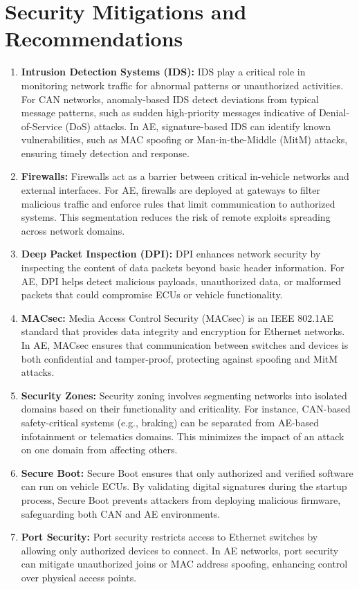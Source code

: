 \documentclass{report}
\begin{document}
\section{Security Mitigations and Recommendations}
\begin{enumerate}
    \item \textbf{Intrusion Detection Systems (IDS):}
    IDS play a critical role in monitoring network traffic for abnormal patterns or unauthorized activities. For CAN networks, anomaly-based IDS detect deviations from typical message patterns, such as sudden high-priority messages indicative of Denial-of-Service (DoS) attacks. In AE, signature-based IDS can identify known vulnerabilities, such as MAC spoofing or Man-in-the-Middle (MitM) attacks, ensuring timely detection and response.

    \item \textbf{Firewalls:}
    Firewalls act as a barrier between critical in-vehicle networks and external interfaces. For AE, firewalls are deployed at gateways to filter malicious traffic and enforce rules that limit communication to authorized systems. This segmentation reduces the risk of remote exploits spreading across network domains.

    \item \textbf{Deep Packet Inspection (DPI):}
    DPI enhances network security by inspecting the content of data packets beyond basic header information. For AE, DPI helps detect malicious payloads, unauthorized data, or malformed packets that could compromise ECUs or vehicle functionality.

    \item \textbf{MACsec:}
    Media Access Control Security (MACsec) is an IEEE 802.1AE standard that provides data integrity and encryption for Ethernet networks. In AE, MACsec ensures that communication between switches and devices is both confidential and tamper-proof, protecting against spoofing and MitM attacks.

    \item \textbf{Security Zones:}
    Security zoning involves segmenting networks into isolated domains based on their functionality and criticality. For instance, CAN-based safety-critical systems (e.g., braking) can be separated from AE-based infotainment or telematics domains. This minimizes the impact of an attack on one domain from affecting others.

    \item \textbf{Secure Boot:}
    Secure Boot ensures that only authorized and verified software can run on vehicle ECUs. By validating digital signatures during the startup process, Secure Boot prevents attackers from deploying malicious firmware, safeguarding both CAN and AE environments.

    \item \textbf{Port Security:}
    Port security restricts access to Ethernet switches by allowing only authorized devices to connect. In AE networks, port security can mitigate unauthorized joins or MAC address spoofing, enhancing control over physical access points.
\end{enumerate}
\end{document}
